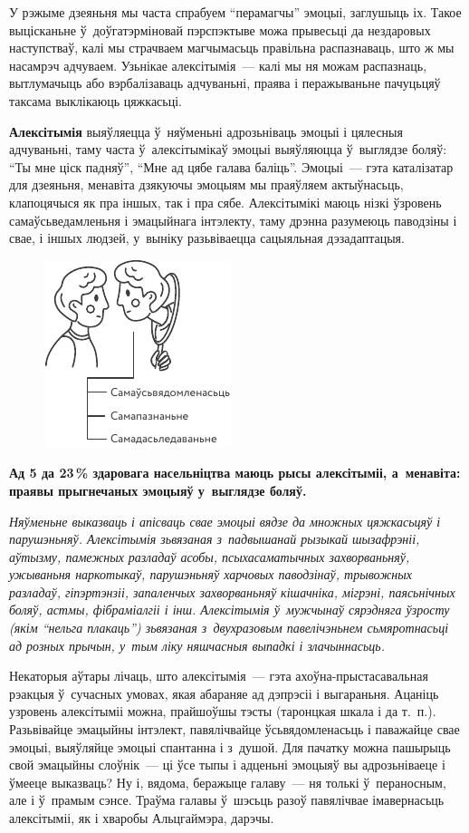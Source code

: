 У рэжыме дзеяньня мы часта спрабуем ``перамагчы'' эмоцыі, заглушыць іх. Такое выцісканьне ў~доўгатэрміновай пэрспэктыве можа прывесьці да нездаровых наступстваў, калі мы страчваем магчымасьць правільна распазнаваць, што ж мы насамрэч адчуваем. Узьнікае алексітымія~--- калі мы ня можам распазнаць, вытлумачыць або вэрбалізаваць адчуваньні, праява і перажываньне пачуцьцяў таксама выклікаюць цяжкасьці.

\textbf{Алексітымія} выяўляецца ў~няўменьні адрозьніваць эмоцыі і цялесныя адчуваньні, таму часта ў~алексітымікаў эмоцыі выяўляюцца ў~выглядзе боляў: ``Ты мне ціск падняў'', ``Мне ад цябе галава баліць''. Эмоцыі~--- гэта каталізатар для дзеяньня, менавіта дзякуючы эмоцыям мы праяўляем актыўнасьць, клапоцячыся як пра іншых, так і пра сябе. Алексітымікі маюць нізкі ўзровень самаўсьведамленьня і эмацыйнага інтэлекту, таму дрэнна разумеюць паводзіны і свае, і іншых людзей, у~выніку разьвіваецца сацыяльная дэзадаптацыя.

\begin{figure}[htb!]
  \centering
  \includegraphics[scale=1.5]{willpower/ch8/9.pdf}
\end{figure}

\textbf{Ад 5 да 23\,\% здаровага насельніцтва маюць рысы алексітыміі, а~менавіта: праявы прыгнечаных эмоцыяў у~выглядзе боляў.}

\emph{Няўменьне выказваць і апісваць свае эмоцыі вядзе да множных цяжкасьцяў і парушэньняў. Алексітымія зьвязаная з~падвышанай рызыкай шызафрэніі, аўтызму, памежных разладаў асобы, псыхасаматычных захворваньняў, ужываньня наркотыкаў, парушэньняў харчовых паводзінаў, трывожных разладаў, гіпэртэнзіі, запаленчых захворваньняў кішачніка, мігрэні, паясьнічных боляў, астмы, фібраміалгіі і інш. Алексітымія ў~мужчынаў сярэдняга ўзросту (якім ``нельга плакаць'') зьвязаная з~двухразовым павелічэньнем сьмяротнасьці ад розных прычын, у~тым ліку няшчасныя выпадкі і злачыннасьць.}

Некаторыя аўтары лічаць, што алексітымія~--- гэта ахоўна-прыстасавальная рэакцыя ў~сучасных умовах, якая абараняе ад дэпрэсіі і выгараньня. Ацаніць узровень алексітыміі можна, прайшоўшы тэсты (таронцкая шкала і да т.~п.). Разьвівайце эмацыйны інтэлект, павялічвайце ўсьвядомленасьць і паважайце свае эмоцыі, выяўляйце эмоцыі спантанна і з~душой. Для пачатку можна пашырыць свой эмацыйны слоўнік~--- ці ўсе тыпы і адценьні эмоцыяў вы адрозьніваеце і ўмееце выказваць? Ну і, вядома, беражыце галаву~--- ня толькі ў~пераносным, але і ў~прамым сэнсе. Траўма галавы ў~шэсьць разоў павялічвае імавернасьць алексітыміі, як і хваробы Альцгаймэра, дарэчы.

